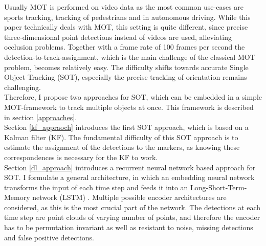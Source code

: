 \documentclass[12pt,a4paper]{article}
\begin{document}
Usually MOT is performed on video data as the most common use-cases are sports tracking, tracking of pedestrians and in autonomous driving. While this paper technically deals with MOT, this setting is quite different, since precise three-dimensional point detections instead of videos are used, alleviating occlusion problems. Together with a frame rate of 100 frames per second the detection-to-track-assignment, which is the main challenge of the classical MOT problem, becomes relatively easy. The difficulty shifts towards accurate Single Object Tracking (SOT), especially the precise tracking of orientation remains challenging. 
\\
Therefore, I propose two approaches for SOT, which can be embedded in a simple MOT-framework to track multiple objects at once. This framework is described in section \ref{approaches}. \\
Section \ref{kf_appraoch} introduces the first SOT approach, which is based on a Kalman filter (KF). The fundamental difficulty of this SOT approach is to estimate the assignment of the detections to the markers, as knowing these correspondences is necessary for the KF to work.
\\
Section \ref{dl_approach} introduces a recurrent neural network based approach for SOT. I formulate a general architecture, in which an embedding neural network transforms the input of each time step and feeds it into an Long-Short-Term-Memory  network (LSTM) \cite{LSTM}. Multiple possible encoder architectures are considered, as this is the most crucial part of the network. The detections at each time step are point clouds of varying number of points, and therefore the encoder has to be permutation invariant as well as resistant to noise, missing detections and false positive detections.\\
\end{document}
